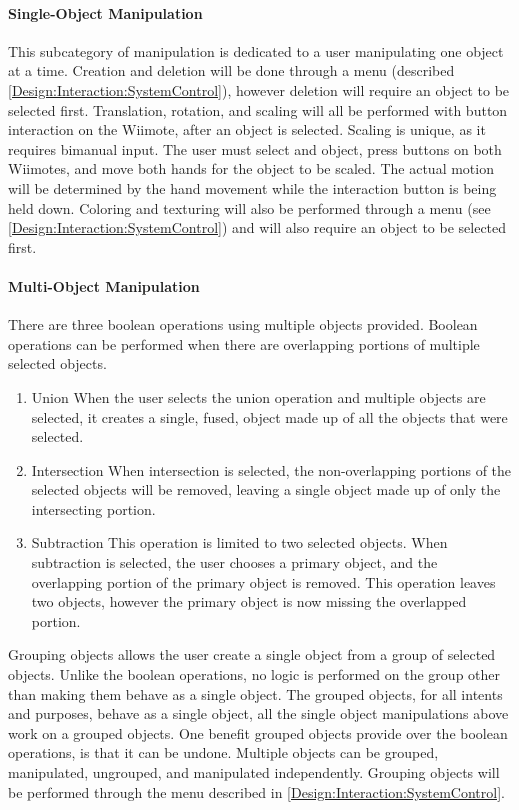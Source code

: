 \paragraph{Single-Object Manipulation}
This subcategory of manipulation is dedicated to a user manipulating one object at a time.
Creation and deletion will be done through a menu (described \ref{Design:Interaction:SystemControl}), however deletion will require an object to be selected first.
Translation, rotation, and scaling will all be performed with button interaction on the Wiimote, after an object is selected.
Scaling is unique, as it requires bimanual input.
The user must select and object, press buttons on both Wiimotes, and move both hands for the object to be scaled.
The actual motion will be determined by the hand movement while the interaction button is being held down.
Coloring and texturing will also be performed through a menu (see \ref{Design:Interaction:SystemControl}) and will also require an object to be selected first.

\paragraph{Multi-Object Manipulation}
There are three boolean operations using multiple objects provided.  Boolean operations can be performed when there are overlapping portions of multiple selected objects.
\begin{enumerate}
	\item Union
	\subitem When the user selects the union operation and multiple objects are selected, it creates a single, fused, object made up of all the objects that were selected.
	\item Intersection
	\subitem When intersection is selected, the non-overlapping portions of the selected objects will be removed, leaving a single object made up of only the intersecting portion.
	\item Subtraction
	\subitem This operation is limited to two selected objects.  When subtraction is selected, the user chooses a primary object, and the overlapping portion of the primary object is removed.  This operation leaves two objects, however the primary object is now missing the overlapped portion.
\end{enumerate}

Grouping objects allows the user create a single object from a group of selected objects.
Unlike the boolean operations, no logic is performed on the group other than making them behave as a single object.
The grouped objects, for all intents and purposes, behave as a single object, all the single object manipulations above work on a grouped objects.
One benefit grouped objects provide over the boolean operations, is that it can be undone.
Multiple objects can be grouped, manipulated, ungrouped, and manipulated independently.
Grouping objects will be performed through the menu described in \ref{Design:Interaction:SystemControl}.

